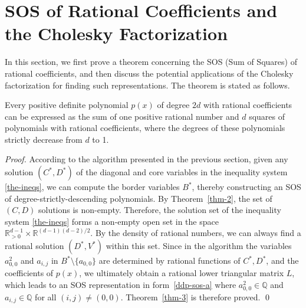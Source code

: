 \documentclass[runningheads]{llncs}
\begin{document}
\section{SOS of Rational Coefficients and the Cholesky Factorization}
\label{rational-SOS}

In this section, we first prove a theorem concerning the SOS (Sum of Squares) of rational coefficients, and then discuss the potential applications of the Cholesky factorization for finding such representations. The theorem is stated as follows.

\begin{theorem}
Every positive definite polynomial \( p(x) \) of degree \( 2d \) with rational coefficients can be expressed as the sum of one positive rational number and \( d \) squares of polynomials with rational coefficients, where the degrees of these polynomials strictly decrease from \( d \) to 1.
\label{thm-3}
\end{theorem}

\begin{proof}
    According to the algorithm presented in the previous section, given any solution \((C^{\ast}, D^{\ast})\) of the diagonal and core variables in the inequality system \eqref{the-ineqs}, we can compute the border variables \( B^{\ast} \), thereby constructing an SOS of degree-strictly-descending polynomials. By Theorem~\ref{thm-2}, the set of \((C, D)\) solutions is non-empty. Therefore, the solution set of the inequality system \eqref{the-ineqs} forms a non-empty open set in the space \( \mathbb{R}^{d-1}_{>0} \times \mathbb{R}^{(d-1)(d-2)/2} \). By the density of rational numbers, we can always find a rational solution \( (D^{\ast}, V^{\ast}) \) within this set. Since in the algorithm the variables \( a_{0,0}^2 \) and \( a_{i,j} \) in \( B^{\ast} \setminus \{a_{0,0}\} \) are determined by rational functions of \( C^{\ast}, D^{\ast} \), and the coefficients of \( p(x) \), we ultimately obtain a rational lower triangular matrix \( L \), which leads to an SOS representation 
    in form~\eqref{ddp-sos-a}
where \( a_{0,0}^2 \in \mathbb{Q} \) and \( a_{i,j} \in \mathbb{Q} \) for all \( (i,j) \neq (0,0) \).
Theorem~\ref{thm-3} is therefore proved. 
\qed 
\end{proof}
\end{document}
